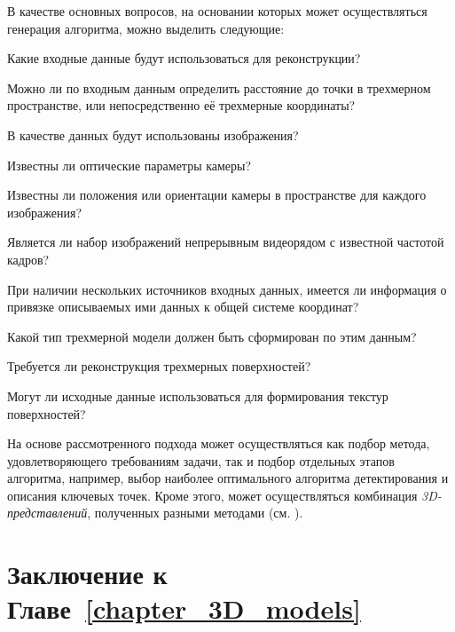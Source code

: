 В качестве основных вопросов, на основании которых может осуществляться генерация алгоритма, можно выделить следующие:
\begin{textitemize}
    \item Какие входные данные будут использоваться для реконструкции?
    \begin{textitemize}
        \item Можно ли по входным данным определить расстояние до точки в трехмерном пространстве, или непосредственно её трехмерные координаты?
        \item В качестве данных будут использованы изображения?
        \begin{textitemize}
            \item Известны ли оптические параметры камеры?
            \item Известны ли положения или ориентации камеры в пространстве для каждого изображения?
            \item Является ли набор изображений непрерывным видеорядом с известной частотой кадров?
        \end{textitemize}
        \item При наличии нескольких источников входных данных, имеется ли информация о привязке описываемых ими данных к общей системе координат?
    \end{textitemize}
    \item Какой тип трехмерной модели должен быть сформирован по этим данным?
    \begin{textitemize}
        \item Требуется ли реконструкция трехмерных поверхностей?
        \begin{textitemize}
            \item Могут ли исходные данные использоваться для формирования текстур поверхностей?
        \end{textitemize}
    \end{textitemize}
\end{textitemize}

На основе рассмотренного подхода может осуществляться как подбор метода, удовлетворяющего требованиям задачи, так и подбор отдельных этапов алгоритма, например, выбор наиболее оптимального алгоритма детектирования и описания ключевых точек.
Кроме этого, может осуществляться комбинация \textit{3D-представлений}, полученных разными методами (см. ).

\section*{Заключение к Главе~\ref{chapter_3D_models}}

